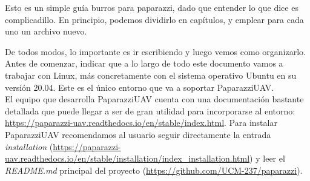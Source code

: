 Esto es un simple guía burros para paparazzi, dado que entender lo que dice es complicadillo.
En principio, podemos dividirlo en capítulos, y emplear para cada uno un archivo nuevo.

De todos modos, lo importante es ir escribiendo y luego vemos como organizarlo. \\

Antes de comenzar, indicar que a lo largo de todo este documento vamos a trabajar con Linux, más concretamente con el sistema operativo Ubuntu en su versión 20.04. Este es el único entorno que va a soportar PaparazziUAV.\\

\noindent El equipo que desarrolla PaparazziUAV cuenta con una documentación bastante detallada que puede llegar a ser de gran utilidad para incorporarse al entorno: \url{https://paparazzi-uav.readthedocs.io/en/stable/index.html}. Para instalar PaparazziUAV recomendamos al usuario seguir directamente la entrada \textit{installation} (\url{https://paparazzi-uav.readthedocs.io/en/stable/installation/index_installation.html}) y leer el \textit{README.md} principal del proyecto (\url{https://github.com/UCM-237/paparazzi}). \\
